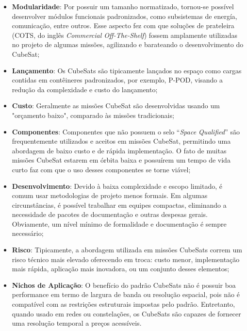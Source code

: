 \begin{itemize}
	
	\item \textbf{Modularidade}: Por possuir um tamanho normatizado, tornou-se possível desenvolver módulos funcionais padronizados, como subsistemas de energía, comunicação, entre outros. Esse aspecto fez com que soluções de prateleira (COTS, do inglês \textit{Commercial Off-The-Shelf}) fossem amplamente utilizadas no projeto de algumas missões, agilizando e barateando o desenvolvimento do CubeSat;
	
	\item \textbf{Lançamento}: Os CubeSats são tipicamente lançados no espaço como cargas contidas em contêineres padronizados, por exemplo, P-POD, visando a redução da complexidade e custo do lançamento;
	\item \textbf{Custo}: Geralmente as missões CubeSat são desenvolvidas usando um "orçamento baixo", comparado às missões tradicionais;
	\item \textbf{Componentes}: Componentes que não possuem o selo “\textit{Space Qualified}” são frequentemente utilizados e aceitos em missões CubeSat, permitindo uma abordagem de baixo custo e de rápida implementação. O fato de muitas missões CubeSat estarem em órbita baixa e possuírem um tempo de vida curto faz com que o uso desses componentes se torne viável;
	\item \textbf{Desenvolvimento}: Devido à baixa complexidade e escopo limitado, é comum usar metodologias de projeto menos formais. Em algumas circunstâncias, é possível trabalhar em equipes compactas, eliminando a necessidade de pacotes de documentação e outras despesas gerais. Obviamente, um nível mínimo de formalidade e documentação é sempre necessário;
	\item \textbf{Risco}: Tipicamente, a abordagem utilizada em missões CubeSats correm um risco técnico mais elevado oferecendo em troca: custo menor, implementação mais rápida, aplicação mais inovadora, ou um conjunto desses elementos;
	\item \textbf{Nichos de Aplicação}: O benefício do padrão CubeSats não é possuir boa performance em termo de largura de banda ou resolução espacial, pois não é compatível com as restrições estruturais impostas pelo padrão. Entretanto, quando usado em redes ou constelações, os CubeSats são capazes de fornecer uma resolução temporal a preços acessíveis.
	
\end{itemize}


